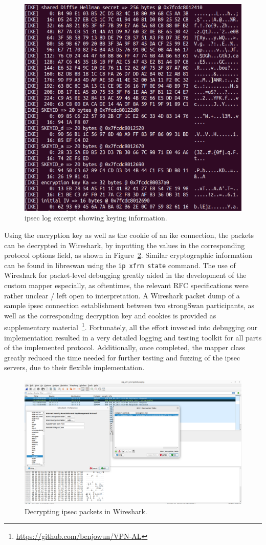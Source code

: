 \begin{figure}
	\centering
	\includegraphics[width=0.7\linewidth]{images/key_material_log}
	\caption{\ac{ipsec} log excerpt showing keying information.}
	\label{fig:keymateriallog}
\end{figure}


Using the encryption key as well as the cookie of an \ac{ike} connection, the packets can be decrypted in Wireshark, by inputting the values in the corresponding protocol options field, as shown in Figure~\ref{fig:wiresharkdecryption}. Similar cryptographic information can be found in libreswan using the \texttt{ip xfrm state} command. The use of Wireshark for packet-level debugging greatly aided in the development of the custom mapper especially, as oftentimes, the relevant RFC specifications were rather unclear / left open to interpretation. A Wireshark packet dump of a sample \ac{ipsec} connection establishment between two strongSwan participants, as well as the corresponding decryption key and cookies is provided as supplementary material~\footnote{\url{https://github.com/benjowun/VPN-AL}}. Fortunately, all the effort invested into debugging our implementation resulted in a very detailed logging and testing toolkit for all parts of the implemented protocol. Additionally, once completed, the mapper class greatly reduced the time needed for further testing and fuzzing of the \ac{ipsec} servers, due to their flexible implementation.

\begin{figure}
	\centering
	\includegraphics[width=\linewidth]{images/wireshark_decryption}
	\caption{Decrypting \ac{ipsec} packets in Wireshark.}
	\label{fig:wiresharkdecryption}
\end{figure}

